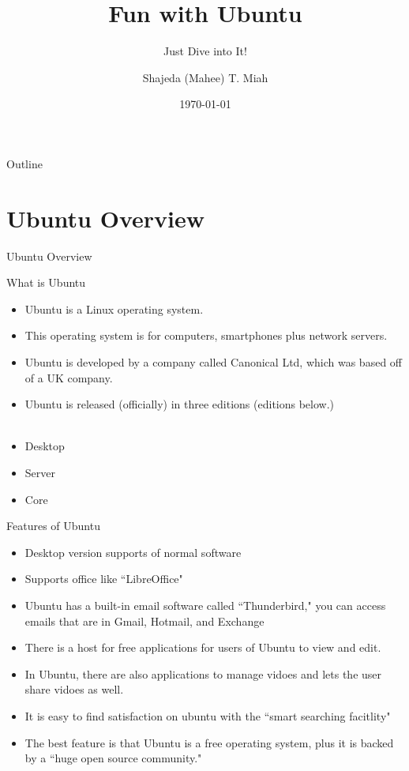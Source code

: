 \documentclass[aspectratio=43]{beamer}
\title{Fun with Ubuntu} %
\subtitle{Just Dive into It!}
\author[S. T. Miah]{Shajeda (Mahee) T. Miah}
\institute[HGES]{
    Fifth Grade%
    \\
    Hickory Grove Elementary School%
    \\
    ~\\
    2514 W Hickory Grove Rd, Dunlap, IL 61525\\
    UNITED STATES
} %
\date{\today}
\begin{document}
    
    \frame{\titlepage}
    
    \begin{frame}{Outline}
        \tableofcontents
    \end{frame}

	\section{Ubuntu Overview}
			
	\begin{frame}{Ubuntu Overview}

\begin{block}{What is Ubuntu}
	\begin{itemize}
	\item  Ubuntu is a Linux operating system. 
	\item This operating system is for computers, smartphones plus network servers.
	\item Ubuntu is developed by a company called Canonical Ltd, which was based off of a UK company.
	\item Ubuntu is released (officially) in three editions (editions below.)
	\\
	~\\
	\item Desktop
	\item Server
	\item Core
	\end{itemize}		
\end{block}
\end{frame}		
	
\begin{frame}{Features of Ubuntu}
\begin{itemize}
\item Desktop version supports of normal software 

\item Supports office like ``LibreOffice"

\item Ubuntu has a built-in email software called ``Thunderbird," you can access emails that are in Gmail, Hotmail, and Exchange

\item There is a host for free applications for users of Ubuntu to view and edit.

\item In Ubuntu, there are also applications to manage vidoes and lets the user share vidoes as well.

\item It is easy to find satisfaction on ubuntu with the ``smart searching facitlity"

\item The best feature is that Ubuntu is a free operating system, plus it is backed by a ``huge open source community."


\end{itemize}


\end{frame}	
\end{document}
